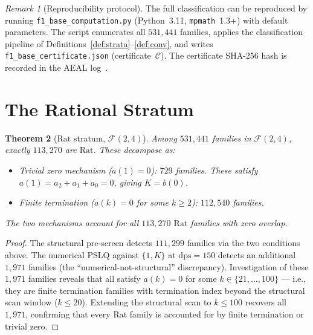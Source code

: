 \documentclass[12pt, reqno]{amsart}
\newtheorem{theorem}{Theorem}[section]
\theoremstyle{definition}
\theoremstyle{remark}
\newtheorem{remark}[theorem]{Remark}
\newcommand{\Rat}{\mathrm{Rat}}
\begin{document}
\begin{remark}[Reproducibility protocol]\label{rem:reproduce}
The full classification can be reproduced by running
\texttt{f1\_base\_computation.py} (Python~3.11, \texttt{mpmath}~1.3+)
with default parameters. The script enumerates all $531{,}441$ families,
applies the classification pipeline of Definitions~\ref{def:strata}--\ref{def:conv},
and writes \texttt{f1\_base\_certificate.json} (certificate~$\mathcal{C}$).
The certificate SHA-256 hash is recorded in the AEAL log~\cite{aeal}.
\end{remark}


\section{The Rational Stratum}\label{sec:rat}

\begin{theorem}[$\Rat$ stratum, $\mathcal{F}(2,4)$]\label{thm:rat}
Among $531{,}441$ families in $\mathcal{F}(2,4)$,
exactly $113{,}270$ are $\Rat$. These decompose as:
\begin{itemize}
\item \emph{Trivial zero mechanism} ($a(1)=0$): $729$ families.
  These satisfy $a(1) = a_2 + a_1 + a_0 = 0$, giving $K = b(0)$.
\item \emph{Finite termination} ($a(k)=0$ for some $k\ge 2$): $112{,}540$ families.
\end{itemize}
The two mechanisms account for all $113{,}270$ $\Rat$ families with zero overlap.
\end{theorem}

\begin{proof}
The structural pre-screen detects $111{,}299$ families via the
two conditions above. The numerical PSLQ against $\{1, K\}$ at $\mathrm{dps}=150$
detects an additional $1{,}971$ families (the ``numerical-not-structural''
discrepancy). Investigation of these $1{,}971$ families reveals that all
satisfy $a(k) = 0$ for some $k \in \{21,\dots,100\}$ --- i.e., they are finite
termination families with termination index beyond the structural
scan window ($k \le 20$). Extending the structural scan to $k \le 100$
recovers all $1{,}971$, confirming that every $\Rat$ family is accounted for
by finite termination or trivial zero.
\end{proof}
\end{document}
